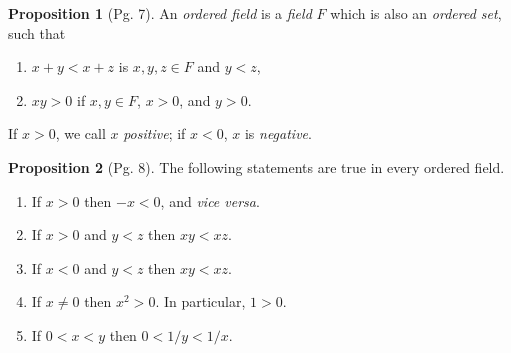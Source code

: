 \documentclass[leqno]{article}
\theoremstyle{definition}
\newtheorem{prop}{Proposition}[section]
\theoremstyle{remark}
\begin{document}
        \begin{prop}[Pg. 7]\label{prop:2.4}
            An \emph{ordered field} is a \emph{field} $F$ which is also an \emph{ordered set}, such that
                \begin{enumerate}[label=(\roman*)]
                    \item $x+y<x+z$ is $x,y,z\in F$ and $y<z$,
                    \item $xy>0$ if $x,y\in F$, $x>0$, and $y>0$. 
                \end{enumerate}
            If $x>0$, we call $x$ \emph{positive}; if $x<0$, $x$ is \emph{negative}. \cite{rud}
        \end{prop}
        \begin{prop}[Pg. 8]\label{prop:2.5}
            The following statements are true in every ordered field.
                \begin{enumerate}[label=(\alph*)]
                    \item If $x>0$ then $-x<0$, and \emph{vice versa}.
                    \item If $x>0$ and $y<z$ then $xy<xz$.
                    \item If $x<0$ and $y<z$ then $xy<xz$.
                    \item If $x\neq 0$ then $x^2>0$. In particular, $1>0$.
                    \item If $0<x<y$ then $0<1/y<1/x$. \cite{rud}
                \end{enumerate}
        \end{prop}
\end{document}
